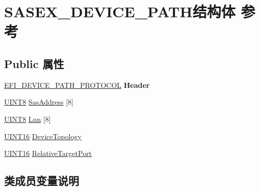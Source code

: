 \hypertarget{struct_s_a_s_e_x___d_e_v_i_c_e___p_a_t_h}{}\section{S\+A\+S\+E\+X\+\_\+\+D\+E\+V\+I\+C\+E\+\_\+\+P\+A\+T\+H结构体 参考}
\label{struct_s_a_s_e_x___d_e_v_i_c_e___p_a_t_h}
\subsection*{Public 属性}
\begin{DoxyCompactItemize}
\item 
\mbox{\label{struct_s_a_s_e_x___d_e_v_i_c_e___p_a_t_h_ad6c061386954cb484909b6229f479613}} 
\hyperlink{struct_e_f_i___d_e_v_i_c_e___p_a_t_h___p_r_o_t_o_c_o_l}{E\+F\+I\+\_\+\+D\+E\+V\+I\+C\+E\+\_\+\+P\+A\+T\+H\+\_\+\+P\+R\+O\+T\+O\+C\+OL} {\bfseries Header}
\item 
\hyperlink{_processor_bind_8h_ab27e9918b538ce9d8ca692479b375b6a}{U\+I\+N\+T8} \hyperlink{struct_s_a_s_e_x___d_e_v_i_c_e___p_a_t_h_a6a912ec8e38f5010d5c0d56a72e4f18e}{Sas\+Address} \mbox{[}8\mbox{]}
\item 
\hyperlink{_processor_bind_8h_ab27e9918b538ce9d8ca692479b375b6a}{U\+I\+N\+T8} \hyperlink{struct_s_a_s_e_x___d_e_v_i_c_e___p_a_t_h_a482828eea5fc556978011f048fb14df0}{Lun} \mbox{[}8\mbox{]}
\item 
\hyperlink{_processor_bind_8h_a09f1a1fb2293e33483cc8d44aefb1eb1}{U\+I\+N\+T16} \hyperlink{struct_s_a_s_e_x___d_e_v_i_c_e___p_a_t_h_a0984f1937357a37e0542f203bfa4a337}{Device\+Topology}
\item 
\hyperlink{_processor_bind_8h_a09f1a1fb2293e33483cc8d44aefb1eb1}{U\+I\+N\+T16} \hyperlink{struct_s_a_s_e_x___d_e_v_i_c_e___p_a_t_h_acc3ae5f11fb5562f0cebacdca4c7f9eb}{Relative\+Target\+Port}
\end{DoxyCompactItemize}


\subsection{类成员变量说明}
\mbox{\label{struct_s_a_s_e_x___d_e_v_i_c_e___p_a_t_h_a0984f1937357a37e0542f203bfa4a337}} 
